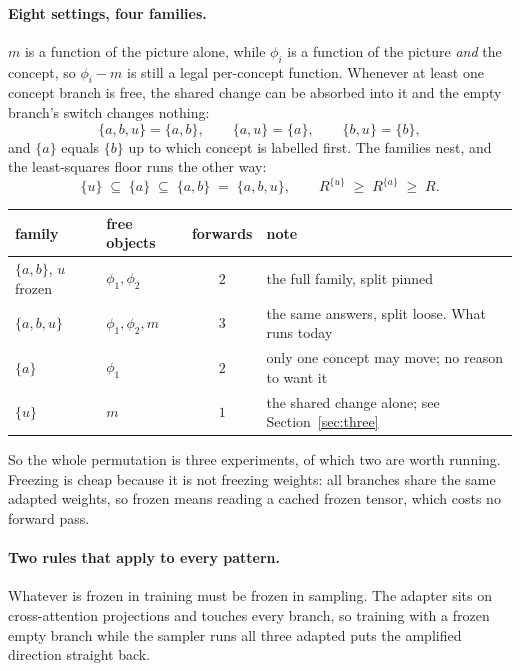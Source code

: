 \documentclass[11pt]{article}
\begin{document}
\paragraph{Eight settings, four families.}
$m$ is a function of the picture alone, while $\phi_i$ is a function of the picture \emph{and} the
concept, so $\phi_i - m$ is still a legal per-concept function. Whenever at least one concept
branch is free, the shared change can be absorbed into it and the empty branch's switch changes
nothing:
\begin{equation}
  \{a,b,u\} = \{a,b\}, \qquad
  \{a,u\} = \{a\}, \qquad
  \{b,u\} = \{b\},
  \label{eq:collapse}
\end{equation}
and $\{a\}$ equals $\{b\}$ up to which concept is labelled first. The families nest, and the
least-squares floor runs the other way:
\begin{equation}
  \{u\} \;\subseteq\; \{a\} \;\subseteq\; \{a,b\} \;=\; \{a,b,u\},
  \qquad
  R^{\{u\}} \;\ge\; R^{\{a\}} \;\ge\; R .
\end{equation}

\begin{center}
\small
\begin{tabular}{p{} p{} c p{}}
\toprule
family & free objects & forwards & note \\
\midrule
$\{a,b\}$, $u$ frozen & $\phi_1,\phi_2$ & $2$ & the full family, split pinned \\
$\{a,b,u\}$ & $\phi_1,\phi_2,m$ & $3$ & the same answers, split loose. What runs today \\
$\{a\}$ & $\phi_1$ & $2$ & only one concept may move; no reason to want it \\
$\{u\}$ & $m$ & $1$ & the shared change alone; see Section~\ref{sec:three} \\
\bottomrule
\end{tabular}
\end{center}

So the whole permutation is three experiments, of which two are worth running. Freezing is cheap
because it is not freezing weights: all branches share the same adapted weights, so frozen means
reading a cached frozen tensor, which costs no forward pass.

\paragraph{Two rules that apply to every pattern.}
Whatever is frozen in training must be frozen in sampling. The adapter sits on cross-attention
projections and touches every branch, so training with a frozen empty branch while the sampler runs
all three adapted puts the amplified direction straight back.
\end{document}
